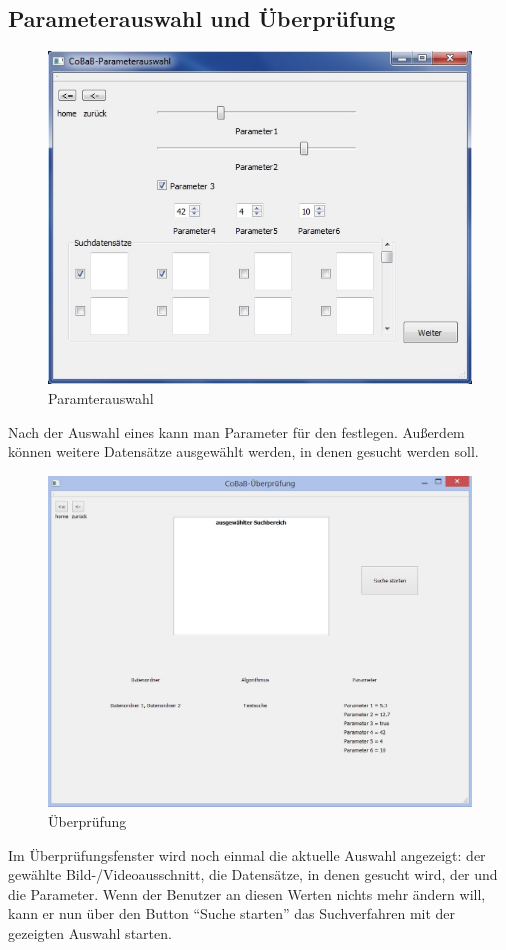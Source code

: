 \subsection{Parameterauswahl und Überprüfung}
\begin{figure}[H]
\includegraphics[width=1\linewidth]{img/Parameterauswahl}
\caption{Paramterauswahl}
\label{fig:parameterauswahl}
\end{figure}
Nach der Auswahl eines  kann man Parameter für den  festlegen. Außerdem können weitere Datensätze ausgewählt werden, in denen gesucht werden soll.

\begin{figure}[H]
\includegraphics[width=1\linewidth]{img/Ueberpruefung}
\caption{Überprüfung}
\label{fig:überprüfung}
\end{figure}
Im Überprüfungsfenster wird noch einmal die aktuelle Auswahl angezeigt: der gewählte Bild-/Videoausschnitt, die Datensätze, in denen gesucht wird, der  und die Parameter. Wenn der Benutzer an diesen Werten nichts mehr ändern will, kann er nun über den Button \enquote{Suche starten} das \gls{Suchverfahren} mit der gezeigten Auswahl starten.

